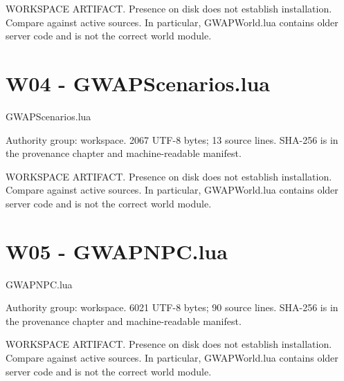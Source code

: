WORKSPACE ARTIFACT.\allowbreak{} Presence on disk does not establish installation.\allowbreak{} Compare against active sources.\allowbreak{} In particular, GWAPWorld.\allowbreak{}lua contains older server code and is not the correct world module.\allowbreak{}

\begingroup{}
\endgroup
\chapter{W04 - GWAPScenarios.\allowbreak{}lua}
\label{src:W04}
GWAPScenarios.\allowbreak{}lua

Authority group: workspace.\allowbreak{} 2067 UTF-8 bytes; 13 source lines.\allowbreak{} SHA-256 is in the provenance chapter and machine-readable manifest.\allowbreak{}

WORKSPACE ARTIFACT.\allowbreak{} Presence on disk does not establish installation.\allowbreak{} Compare against active sources.\allowbreak{} In particular, GWAPWorld.\allowbreak{}lua contains older server code and is not the correct world module.\allowbreak{}

\begingroup{}
\endgroup
\chapter{W05 - GWAPNPC.\allowbreak{}lua}
\label{src:W05}
GWAPNPC.\allowbreak{}lua

Authority group: workspace.\allowbreak{} 6021 UTF-8 bytes; 90 source lines.\allowbreak{} SHA-256 is in the provenance chapter and machine-readable manifest.\allowbreak{}

WORKSPACE ARTIFACT.\allowbreak{} Presence on disk does not establish installation.\allowbreak{} Compare against active sources.\allowbreak{} In particular, GWAPWorld.\allowbreak{}lua contains older server code and is not the correct world module.\allowbreak{}

\begingroup{}
\endgroup
